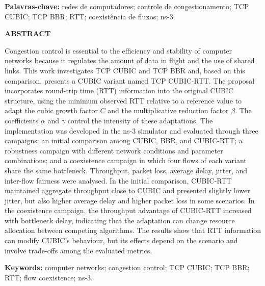 \documentclass[a4paper,12pt]{monografia}
\begin{document}
\vspace{1cm}
\noindent \textbf{Palavras-chave:} redes de computadores; controle de congestionamento; TCP CUBIC; TCP BBR; RTT; coexistência de fluxos; ns-3.

\newpage

\begin{center}
    {\large \textbf{ABSTRACT}}
\end{center}
Congestion control is essential to the efficiency and stability of computer networks because it regulates the amount of data in flight and the use of shared links. This work investigates TCP CUBIC and TCP BBR and, based on this comparison, presents a CUBIC variant named TCP CUBIC-RTT. The proposal incorporates round-trip time (RTT) information into the original CUBIC structure, using the minimum observed RTT relative to a reference value to adapt the cubic growth factor $C$ and the multiplicative reduction factor $\beta$. The coefficients $\alpha$ and $\gamma$ control the intensity of these adaptations. The implementation was developed in the ns-3 simulator and evaluated through three campaigns: an initial comparison among CUBIC, BBR, and CUBIC-RTT; a robustness campaign with different network conditions and parameter combinations; and a coexistence campaign in which four flows of each variant share the same bottleneck. Throughput, packet loss, average delay, jitter, and inter-flow fairness were analysed. In the initial comparison, CUBIC-RTT maintained aggregate throughput close to CUBIC and presented slightly lower jitter, but also higher average delay and higher packet loss in some scenarios. In the coexistence campaign, the throughput advantage of CUBIC-RTT increased with bottleneck delay, indicating that the adaptation can change resource allocation between competing algorithms. The results show that RTT information can modify CUBIC's behaviour, but its effects depend on the scenario and involve trade-offs among the evaluated metrics.

\vspace{1cm}
\noindent \textbf{Keywords:} computer networks; congestion control; TCP CUBIC; TCP BBR; RTT; flow coexistence; ns-3.

\newpage

\listoffigures
\newpage

\listoftables
\newpage

\tableofcontents
\newpage

\end{document}
